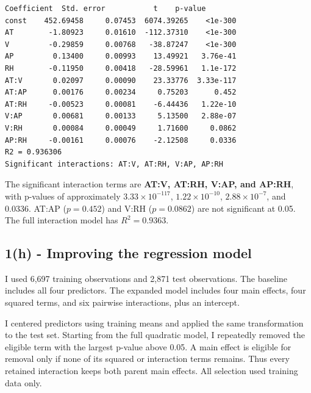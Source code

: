 \documentclass[11pt]{article}
\begin{document}
    \begin{minipage}{\linewidth}
\begin{Verbatim}[commandchars=\\\{\}]
       Coefficient  Std. error           t    p-value
const    452.69458     0.07453  6074.39265    <1e-300
AT        -1.80923     0.01610  -112.37310    <1e-300
V         -0.29859     0.00768   -38.87247    <1e-300
AP         0.13400     0.00993    13.49921   3.76e-41
RH        -0.11950     0.00418   -28.59961   1.1e-172
AT:V       0.02097     0.00090    23.33776  3.33e-117
AT:AP      0.00176     0.00234     0.75203      0.452
AT:RH     -0.00523     0.00081    -6.44436   1.22e-10
V:AP       0.00681     0.00133     5.13500   2.88e-07
V:RH       0.00084     0.00049     1.71600     0.0862
AP:RH     -0.00161     0.00076    -2.12508     0.0336
R2 = 0.936306
Significant interactions: AT:V, AT:RH, V:AP, AP:RH
    \end{Verbatim}
\end{minipage}

    The significant interaction terms are \textbf{AT:V, AT:RH, V:AP, and
AP:RH}, with p-values of approximately \(3.33\times10^{-117}\),
\(1.22\times10^{-10}\), \(2.88\times10^{-7}\), and 0.0336. AT:AP
(\(p=0.452\)) and V:RH (\(p=0.0862\)) are not significant at 0.05. The
full interaction model has \(R^2=0.9363\).

    \hypertarget{h---improving-the-regression-model}{%
\subsection{1(h) - Improving the regression
model}\label{h---improving-the-regression-model}}

I used 6,697 training observations and 2,871 test observations. The
baseline includes all four predictors. The expanded model includes four
main effects, four squared terms, and six pairwise interactions, plus an
intercept.

I centered predictors using training means and applied the same
transformation to the test set. Starting from the full quadratic model,
I repeatedly removed the eligible term with the largest p-value above
0.05. A main effect is eligible for removal only if none of its squared
or interaction terms remains. Thus every retained interaction keeps both
parent main effects. All selection used training data only.
\end{document}
